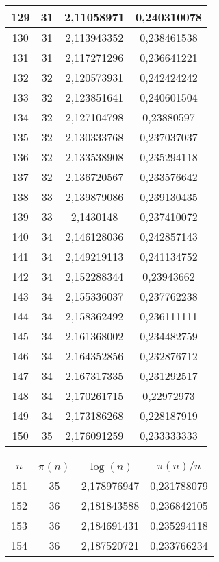{\begin{minipage}[!h]{0.45\textwidth}
\begin{longtable}{cccc}
129 & 31 & 2,11058971 & 0,240310078 \\ \hline
130 & 31 & 2,113943352 & 0,238461538 \\ \hline
131 & 31 & 2,117271296 & 0,236641221 \\ \hline
132 & 32 & 2,120573931 & 0,242424242 \\ \hline
133 & 32 & 2,123851641 & 0,240601504 \\ \hline
134 & 32 & 2,127104798 & 0,23880597 \\ \hline
135 & 32 & 2,130333768 & 0,237037037 \\ \hline
136 & 32 & 2,133538908 & 0,235294118 \\ \hline
137 & 32 & 2,136720567 & 0,233576642 \\ \hline
138 & 33 & 2,139879086 & 0,239130435 \\ \hline
139 & 33 & 2,1430148 & 0,237410072 \\ \hline
140 & 34 & 2,146128036 & 0,242857143 \\ \hline
141 & 34 & 2,149219113 & 0,241134752 \\ \hline
142 & 34 & 2,152288344 & 0,23943662 \\ \hline
143 & 34 & 2,155336037 & 0,237762238 \\ \hline
144 & 34 & 2,158362492 & 0,236111111 \\ \hline
145 & 34 & 2,161368002 & 0,234482759 \\ \hline
146 & 34 & 2,164352856 & 0,232876712 \\ \hline
147 & 34 & 2,167317335 & 0,231292517 \\ \hline
148 & 34 & 2,170261715 & 0,22972973 \\ \hline
149 & 34 & 2,173186268 & 0,228187919 \\ \hline
150 & 35 & 2,176091259 & 0,233333333 \\ \hline
\end{longtable}
\end{minipage}
\begin{minipage}[!h]{0.45\textwidth}\centering
\tiny
\begin{longtable}{cccc} \hline
\(n\) & \(\pi(n)\) & \(\log(n)\) & \(\pi(n)/n\) \\ \hline151 & 35 & 2,178976947 & 0,231788079 \\ \hline
152 & 36 & 2,181843588 & 0,236842105 \\ \hline
153 & 36 & 2,184691431 & 0,235294118 \\ \hline
154 & 36 & 2,187520721 & 0,233766234 \\ \hline

\end{longtable}
\end{minipage}}

